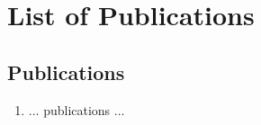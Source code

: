 \chapter{List of Publications}
\label{chapter:publications}
%
\begin{singlespace}
\vspace{-5mm}



\section*{Publications}
\begin{enumerate}
\item ... publications ...
\end{enumerate}




\end{singlespace}

